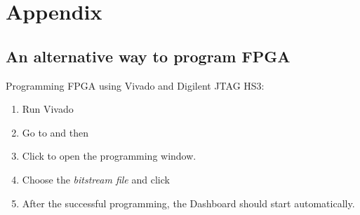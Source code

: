 \documentclass[12pt,oneside,a4]{article}
\begin{document}
\section{Appendix}
\subsection{An alternative way to program FPGA}
Programming FPGA using Vivado and Digilent JTAG HS3:
\begin{enumerate}
		\item Run Vivado
		\item Go to  and then  
		\item Click  to open the programming window.
		\item Choose the \textit{bitstream file} and click 

	\item After the successful programming, the Dashboard should start automatically.
\end{enumerate}
\begin{thebibliography}{99}
\end{thebibliography}
\end{document}
